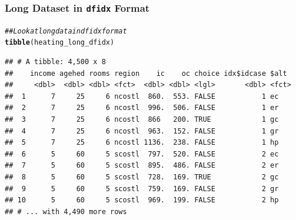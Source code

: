 \documentclass{beamer}\usepackage[]{graphicx}\usepackage[]{xcolor}
\makeatletter
\newcommand{\hlcom}[1]{\textcolor[rgb]{0.678,0.584,0.686}{\textit{#1}}}%
\newcommand{\hlstd}[1]{\textcolor[rgb]{0.345,0.345,0.345}{#1}}%
\newcommand{\hlkwd}[1]{\textcolor[rgb]{0.737,0.353,0.396}{\textbf{#1}}}%
\newenvironment{kframe}{%
 \def\at@end@of@kframe{}%
 \ifinner\ifhmode%
  \def\at@end@of@kframe{\end{minipage}}%
  \begin{minipage}{\columnwidth}%
 \fi\fi%
 \def\FrameCommand##1{\hskip\@totalleftmargin \hskip-\fboxsep
 \colorbox{shadecolor}{##1}\hskip-\fboxsep
     \hskip-\linewidth \hskip-\@totalleftmargin \hskip\columnwidth}%
 \MakeFramed {\advance\hsize-\width
   \@totalleftmargin\z@ \linewidth\hsize
   \@setminipage}}%
 {\par\unskip\endMakeFramed%
 \at@end@of@kframe}
\newenvironment{knitrout}{}{} %
\makeatother
\begin{document}
\begin{frame}[fragile]\frametitle{Long Dataset in \texttt{dfidx} Format}
\begin{knitrout}\footnotesize
{}\color{fgcolor}\begin{kframe}
\begin{alltt}
\hlcom{## Look at long data in dfidx format}
\hlkwd{tibble}\hlstd{(heating_long_dfidx)}
\end{alltt}
\begin{verbatim}
## # A tibble: 4,500 x 8
##    income agehed rooms region    ic    oc choice idx$idcase $alt 
##     <dbl>  <dbl> <dbl> <fct>  <dbl> <dbl> <lgl>       <dbl> <fct>
##  1      7     25     6 ncostl  860.  553. FALSE           1 ec   
##  2      7     25     6 ncostl  996.  506. FALSE           1 er   
##  3      7     25     6 ncostl  866   200. TRUE            1 gc   
##  4      7     25     6 ncostl  963.  152. FALSE           1 gr   
##  5      7     25     6 ncostl 1136.  238. FALSE           1 hp   
##  6      5     60     5 scostl  797.  520. FALSE           2 ec   
##  7      5     60     5 scostl  895.  486. FALSE           2 er   
##  8      5     60     5 scostl  728.  169. TRUE            2 gc   
##  9      5     60     5 scostl  759.  169. FALSE           2 gr   
## 10      5     60     5 scostl  969.  199. FALSE           2 hp   
## # ... with 4,490 more rows
\end{verbatim}
\end{kframe}
\end{knitrout}
\end{frame}
\end{document}
